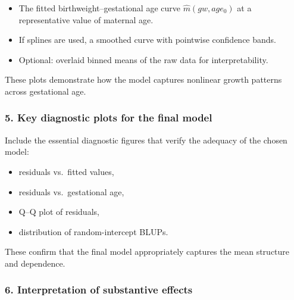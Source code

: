 \documentclass[
  letterpaper,
  DIV=11,
  numbers=noendperiod]{scrreprt}
\providecommand{\tightlist}{%
  \setlength{\itemsep}{0pt}\setlength{\parskip}{0pt}}\usepackage{longtable,booktabs,array}
\begin{document}
\begin{itemize}
\tightlist
\item
  The fitted birthweight--gestational age curve \(\hat{m}(gw, age_0)\)
  at a representative value of maternal age.\\
\item
  If splines are used, a smoothed curve with pointwise confidence
  bands.\\
\item
  Optional: overlaid binned means of the raw data for interpretability.
\end{itemize}

These plots demonstrate how the model captures nonlinear growth patterns
across gestational age.

\hypertarget{key-diagnostic-plots-for-the-final-model}{%
\subsubsection*{\texorpdfstring{\textbf{5. Key diagnostic plots for the
final
model}}{5. Key diagnostic plots for the final model}}\label{key-diagnostic-plots-for-the-final-model}}

Include the essential diagnostic figures that verify the adequacy of the
chosen model:

\begin{itemize}
\tightlist
\item
  residuals vs.~fitted values,\\
\item
  residuals vs.~gestational age,\\
\item
  Q--Q plot of residuals,\\
\item
  distribution of random-intercept BLUPs.
\end{itemize}

These confirm that the final model appropriately captures the mean
structure and dependence.

\hypertarget{interpretation-of-substantive-effects}{%
\subsubsection*{\texorpdfstring{\textbf{6. Interpretation of substantive
effects}}{6. Interpretation of substantive effects}}\label{interpretation-of-substantive-effects}}
\end{document}
